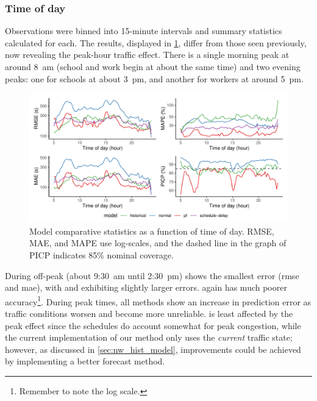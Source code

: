 \subsubsection{Time of day}

Observations were binned into 15-minute intervals and summary statistics calculated for each. The results, displayed in \cref{fig:model_results_rmse_timeofday}, differ from those seen previously, now revealing the peak-hour traffic effect. There is a single morning peak at around 8~am (school and work begin at about the same time) and two evening peaks: one for schools at about 3~pm, and another for workers at around 5~pm.


\begin{knitrout}\small
{}\color{fgcolor}\begin{figure}
\includegraphics[width=\textwidth]{figure/model_results_rmse_timeofday-1} \caption[Model comparative statistics as a function of time of day]{Model comparative statistics as a function of time of day. RMSE, MAE, and MAPE use log-scales, and the dashed line in the graph of PICP indicates 85\% nominal coverage.}\label{fig:model_results_rmse_timeofday}
\end{figure}


\end{knitrout}

During off-peak (about 9:30~am until 2:30~pm) \Fpf{} shows the smallest error (\gls{rmse} and \gls{mae}), with \Fhist{} and \Fsched{} exhibiting slightly larger errors. \Fnorm{} again has much poorer accuracy\footnote{Remember to note the log scale.}. During peak times, all methods show an increase in prediction error as traffic conditions worsen and become more unreliable. \Fsched{} is least affected by the peak effect since the schedules do account somewhat for peak congestion, while the current implementation of our method only uses the \emph{current} traffic state; however, as discussed in \cref{sec:nw_hist_model}, improvements could be achieved by implementing a better forecast method.

